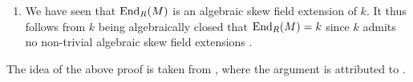 \begin{remark}
\begin{enumerate}[label=\arabic*)]
    \item
      We have seen that $\operatorname{End}_R(M)$ is an algebraic skew field extension of $k$.
      It thus follows from $k$ being algebraically closed that $\operatorname{End}_R(M) = k$ since $k$ admits no non-trivial algebraic skew field extensions
      .
  \end{enumerate}
  The idea of the above proof is taken from \cite{Quillen}, where the argument is attributed to \cite{Dixmier}.
\end{remark}




